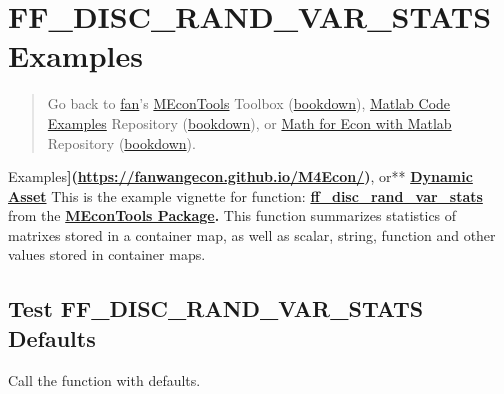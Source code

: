 \documentclass[
]{book}
\begin{document}
\hypertarget{ff_disc_rand_var_stats-examples}{%
\section{FF\_DISC\_RAND\_VAR\_STATS Examples}\label{ff_disc_rand_var_stats-examples}}

\begin{quote}
Go back to \href{http://fanwangecon.github.io/}{fan}'s \href{https://fanwangecon.github.io/MEconTools/}{MEconTools} Toolbox (\href{https://fanwangecon.github.io/MEconTools/bookdown}{bookdown}), \href{https://fanwangecon.github.io/M4Econ/}{Matlab Code Examples} Repository (\href{https://fanwangecon.github.io/M4Econ/bookdown}{bookdown}), or \href{https://fanwangecon.github.io/Math4Econ/}{Math for Econ with Matlab} Repository (\href{https://fanwangecon.github.io/Math4Econ/bookdown}{bookdown}).
\end{quote}

Examples\textbf{{]}(\url{https://fanwangecon.github.io/M4Econ/})}, or** \href{https://fanwangecon.github.io/CodeDynaAsset/}{\textbf{Dynamic
Asset}}
This is the example vignette for function:
\href{https://github.com/FanWangEcon/MEconTools/blob/master/MEconTools/stats/ff_disc_rand_var_stats.m}{\textbf{ff\_disc\_rand\_var\_stats}}
from the \href{https://fanwangecon.github.io/MEconTools/}{\textbf{MEconTools
Package}}\textbf{.} This function
summarizes statistics of matrixes stored in a container map, as well as
scalar, string, function and other values stored in container maps.

\hypertarget{test-ff_disc_rand_var_stats-defaults}{%
\subsection{Test FF\_DISC\_RAND\_VAR\_STATS Defaults}\label{test-ff_disc_rand_var_stats-defaults}}

Call the function with defaults.
\end{document}
